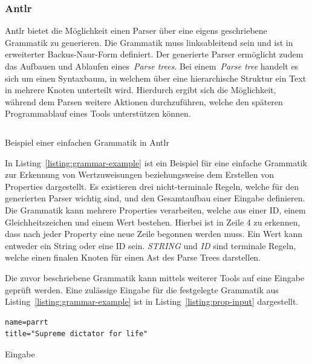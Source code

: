 \subsubsection{Antlr}\label{subsubsec:antlr}
\ac{Antlr} bietet die Möglichkeit einen Parser über eine eigens geschriebene Grammatik zu generieren.
Die Grammatik muss linksableitend sein und ist in erweiterter Backus-Naur-Form definiert.
Der generierte Parser ermöglicht zudem das Aufbauen und Ablaufen eines~\textit{Parse trees}.
Bei einem~\textit{Parse tree} handelt es sich um einen Syntaxbaum, in welchem über eine hierarchische Struktur ein Text in mehrere Knoten unterteilt wird.
Hierdurch ergibt sich die Möglichkeit, während dem Parsen weitere Aktionen durchzuführen, welche den späteren Programmablauf eines Tools unterstützen können.

\begin{listing}[!ht]
    \inputminted{antlr-java}{listings/2.2.1/AntlrExample.g4}
    \caption{Beispiel einer einfachen Grammatik in Antlr}
    \label{listing:grammar-example}
\end{listing}

In Listing~\ref{listing:grammar-example} ist ein Beispiel für eine einfache Grammatik zur Erkennung von Wertzuweisungen beziehungsweise dem Erstellen von
Properties dargestellt.\cite*{antlrOrg}
Es existieren drei nicht-terminale Regeln, welche für den generierten Parser wichtig sind, und den Gesamtaufbau einer Eingabe definieren.
Die Grammatik kann mehrere Properties verarbeiten, welche aus einer ID, einem Gleichheitszeichen und einem Wert bestehen.
Hierbei ist in Zeile 4 zu erkennen, dass nach jeder Property eine neue Zeile begonnen werden muss.
Ein Wert kann entweder ein String oder eine ID sein.
\textit{STRING} und \textit{ID} sind terminale Regeln, welche einen finalen Knoten für einen Ast des Parse Trees darstellen.

Die zuvor beschriebene Grammatik kann mittels weiterer Tools auf eine Eingabe geprüft werden.
Eine zulässige Eingabe für die festgelegte Grammatik aus Listing~\ref{listing:grammar-example} ist in Listing~\ref{listing:prop-input} dargestellt.

\begin{listing}[!ht]
    \begin{verbatim}
name=parrt
title="Supreme dictator for life"

    \end{verbatim}
    \caption{Eingabe}
    \label{listing:prop-input}
\end{listing}

